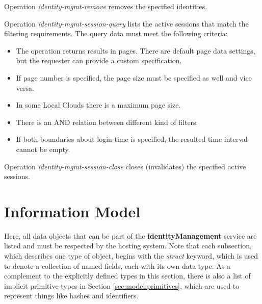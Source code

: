 \documentclass[a4paper]{arrowhead}
\begin{document}

Operation \textit{identity-mgmt-remove} removes the specified identities.


Operation \textit{identity-mgmt-session-query} lists the active sessions that match the filtering requirements. The query data must meet the following criteria:

\begin{itemize}
    \item The operation returns results in pages. There are default page data settings, but the requester can provide a custom specification.
    \item If page number is specified, the page size must be specified as well and vice versa.
    \item In some Local Clouds there is a maximum page size.
    \item There is an AND relation between different kind of filters.
    \item If both boundaries about login time is specified, the resulted time interval cannot be empty.
\end{itemize}


Operation \textit{identity-mgmt-session-close} closes (invalidates) the specified active sessions.

\clearpage

\section{Information Model}
\label{sec:model}

Here, all data objects that can be part of the \textbf{identityManagement} service
are listed and must be respected by the hosting system.
Note that each subsection, which describes one type of object, begins with the \textit{struct} keyword, which is used to denote a collection of named fields, each with its own data type.
As a complement to the explicitly defined types in this section, there is also a list of implicit primitive types in Section \ref{sec:model:primitives}, which are used to represent things like hashes and identifiers.
\end{document}

